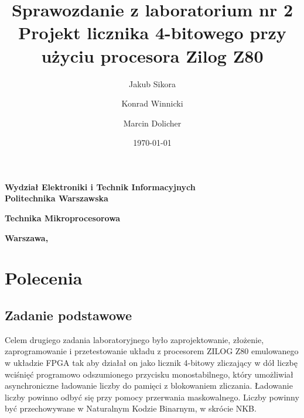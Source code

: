 \documentclass[a4paper,titlepage,11pt,floatssmall]{mwrep}
\title{\bf Sprawozdanie z laboratorium nr 2 \\ Projekt licznika 4-bitowego przy użyciu procesora Zilog Z80 \vskip 0.1cm}
\author{Jakub Sikora \and Konrad Winnicki \and Marcin Dolicher}
\date{\today}
\begin{document}
\makeatletter
\renewcommand{\maketitle}{\begin{titlepage}
		\begin{center}{\LARGE {\bf
					Wydział Elektroniki i Technik Informacyjnych}}\\
			\vspace{0.4cm}
			{\LARGE {\bf Politechnika Warszawska}}\\
			\vspace{0.3cm}
		\end{center}
		\vspace{5cm}
		\begin{center}
			{\bf \LARGE Technika Mikroprocesorowa \vskip 0.1cm}
		\end{center}
		\vspace{1cm}
		\begin{center}
			{\bf \LARGE \@title}
		\end{center}
		\vspace{2cm}
		\begin{center}
			{\bf \Large \@author \par}
		\end{center}
		\vspace*{\stretch{6}}
		\begin{center}
			\bf{\large{Warszawa, \@date\vskip 0.1cm}}
		\end{center}
	\end{titlepage}
	}
\makeatother
\maketitle

\tableofcontents


\chapter{Polecenia}

\section{Zadanie podstawowe}
\indent{} Celem drugiego zadania laboratoryjnego było zaprojektowanie, złożenie, zaprogramowanie i przetestowanie układu z procesorem ZILOG Z80 emulowanego w układzie FPGA tak aby działał on jako licznik 4-bitowy zliczający w dół liczbę wciśnięć programowo odszumionego przycisku monostabilnego, który umożliwiał asynchroniczne ładowanie liczby do pamięci z blokowaniem zliczania. Ładowanie liczby powinno odbyć się przy pomocy przerwania maskowalnego. Liczby powinny być przechowywane w Naturalnym Kodzie Binarnym, w skrócie NKB.
\end{document}
